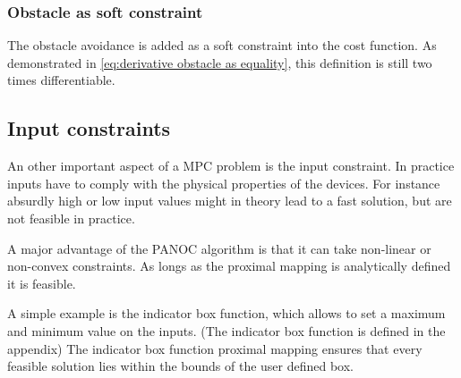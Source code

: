 			\subsubsection{Obstacle as soft constraint}
				The obstacle avoidance is added as a soft constraint into the cost function. As demonstrated in \eqref{eq:derivative obstacle as equality}, this definition is still two times differentiable.
			
		\subsection{Input constraints}
			An other important aspect of a MPC problem is the input constraint. In practice inputs have to comply with the physical properties of the devices. For instance absurdly high or low input values might in theory lead to a fast solution, but are not feasible in practice.
			
			A major advantage of the PANOC algorithm is that it can take non-linear or non-convex constraints. As longs as the proximal mapping is analytically defined it is feasible. 
			
			A simple example is the indicator box function, which allows to set a maximum and minimum value on the inputs. (The indicator box function is defined in the appendix) The  indicator box function proximal mapping ensures that every feasible solution lies within the bounds of the user defined box.